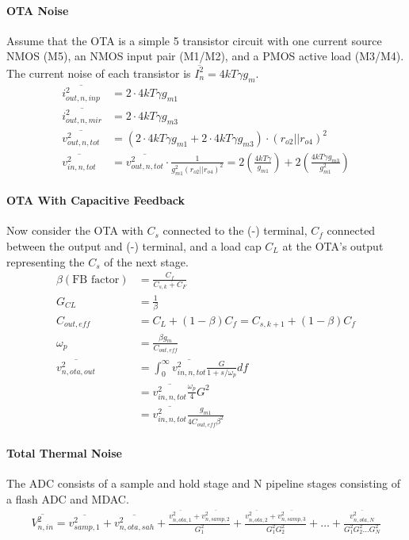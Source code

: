 \documentclass[11pt]{article}
\begin{document}
\paragraph{OTA Noise}
Assume that the OTA is a simple 5 transistor circuit with one current source NMOS (M5), an NMOS input pair (M1/M2), and a PMOS active load (M3/M4).
The current noise of each transistor is $\overline{I^2_{n}} = 4kT\gamma g_m$.
\begin{align*}
  \overline{i^2_{out,n,inp}} &= 2 \cdot 4kT \gamma g_{m1} \\
  \overline{i^2_{out,n,mir}} &= 2 \cdot 4kT \gamma g_{m3} \\
  \overline{v^2_{out,n,tot}} &= \left(2 \cdot 4kT \gamma g_{m1} + 2 \cdot 4kT \gamma g_{m3} \right) \cdot (r_{o2} || r_{o4})^2 \\
  \overline{v^2_{in,n,tot}} &= \overline{v^2_{out,n,tot}} \cdot \frac{1}{g_{m1}^2 (r_{o2} || r_{o4})^2} = 2 \left( \frac{4kT\gamma}{g_{m1}} \right) + 2 \left( \frac{4kT\gamma g_{m3}}{g_{m1}^2} \right)
\end{align*}

\paragraph{OTA With Capacitive Feedback}
Now consider the OTA with $C_s$ connected to the (-) terminal, $C_f$ connected between the output and (-) terminal, and a load cap $C_L$ at the OTA's output representing the $C_s$ of the next stage.
\begin{align*}
  \beta (\text{FB factor}) &= \frac{C_f}{C_{s,k} + C_F} \\
  G_{CL} &= \frac{1}{\beta} \\
  C_{out,eff} &= C_L + (1 - \beta) C_f = C_{s,k+1} + (1 - \beta) C_f \\
  \omega_{p} &= \frac{\beta g_m}{C_{out,eff}} \\
  \overline{v^2_{n,ota,out}} &= \int_{0}^{\infty} \overline{v^2_{in,n,tot}} \frac{G}{1 + s / \omega_{p}} df \\
                             &= \overline{v^2_{in,n,tot}} \frac{\omega_p}{4} G^2 \\
                             &= \overline{v^2_{in,n,tot}} \frac{g_{m1}}{4 C_{out,eff} \beta^2}
\end{align*}

\paragraph{Total Thermal Noise}
The ADC consists of a sample and hold stage and N pipeline stages consisting of a flash ADC and MDAC.
\begin{align*}
  \overline{V^2_{n,in}} = \overline{v^2_{samp, 1}} + \overline{v^2_{n,ota,sah}} + \frac{\overline{v^2_{n,ota,1}} + \overline{v^2_{n,samp,2}}}{G_1^2} + \frac{\overline{v^2_{n,ota,2}} + \overline{v^2_{n,samp,3}}}{G_1^2 G_2^2} + \dots + \frac{\overline{v^2_{n,ota,N}}}{G_1^2 G_2^2 \dots G_N^2}
\end{align*}
\end{document}
